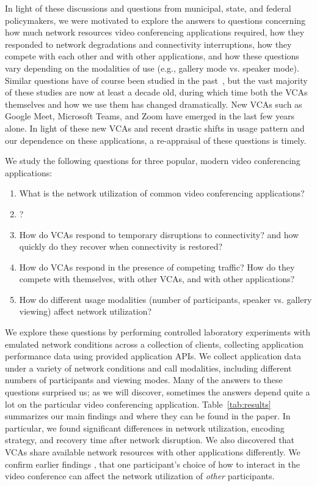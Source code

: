 In light of these discussions and questions from municipal, state, and federal
policymakers, we were motivated to explore the answers to questions concerning
how much network resources video conferencing applications required, how they
responded to network degradations and connectivity interruptions, how they
compete with each other and with other applications, and how these questions
vary depending on the modalities of use (e.g., gallery mode vs. speaker mode).
Similar questions have of course been studied in the
past~\cite{guha2005experimental, baset2004analysis, bonfiglio2008detailed,
bonfiglio2008tracking, xu2012video}, but the vast majority of these studies
are now at least a decade old, during which time both the VCAs themselves and
how we use them has changed dramatically. New VCAs such as Google Meet,
Microsoft Teams, and Zoom have emerged in the last few years alone. In light
of these new VCAs and recent drastic shifts in usage pattern
and our dependence on these applications, a re-appraisal of these questions is
timely.

We study the following questions for three popular, modern video conferencing
applications:
\begin{enumerate}
    \itemsep=-1pt
    \item What is the network utilization of common video conferencing
        applications?
    \item {}?
    \item How do VCAs respond to temporary disruptions to connectivity?
        and how quickly do they recover when connectivity is restored?
    \item How do VCAs respond in the presence of competing traffic? How do
        they compete with themselves, with other VCAs, and with other
        applications?
    \item How do different usage modalities (number of participants, speaker
        vs. gallery viewing) affect network utilization?
\end{enumerate}
\noindent
We explore these questions by performing controlled laboratory experiments
with emulated network conditions across a collection of clients, collecting
application performance data using provided application APIs. We collect
application data under a variety of network conditions and call modalities,
including different numbers of participants and viewing modes. Many of the answers
to these questions surprised us; as we will discover,
sometimes the answers depend quite a lot on the particular video
conferencing application. Table~\ref{tab:results} summarizes our main findings
and where they can be found in the paper. In particular, we found significant
differences in network utilization, encoding strategy, and recovery time after
network disruption. We also discovered that VCAs share available network
resources with other applications differently. We confirm earlier findings 
\cite{cable-labs-vca}, that one participant's choice of how to interact 
in the video conference can affect the network utilization of {\em other} participants.

